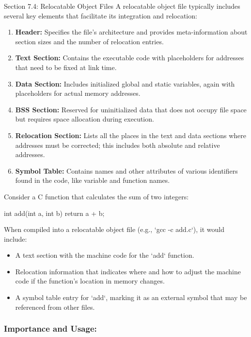 \begin{notes}{Section 7.4: Relocatable Object Files}
    A relocatable object file typically includes several key elements that facilitate its integration and relocation:
    \begin{enumerate}
        \item \textbf{Header:} Specifies the file's architecture and provides meta-information about section sizes and the number of relocation entries.
        \item \textbf{Text Section:} Contains the executable code with placeholders for addresses that need to be fixed at link time.
        \item \textbf{Data Section:} Includes initialized global and static variables, again with placeholders for actual memory addresses.
        \item \textbf{BSS Section:} Reserved for uninitialized data that does not occupy file space but requires space allocation during execution.
        \item \textbf{Relocation Section:} Lists all the places in the text and data sections where addresses must be corrected; this includes both absolute and relative addresses.
        \item \textbf{Symbol Table:} Contains names and other attributes of various identifiers found in the code, like variable and function names.
    \end{enumerate}

    \begin{highlight}[Example]
        Consider a C function that calculates the sum of two integers:
    \begin{code}[C]
    int add(int a, int b) {
        return a + b;
    }
    \end{code}
        When compiled into a relocatable object file (e.g., `gcc -c add.c`), it would include:
        \begin{itemize}
            \item A text section with the machine code for the `add` function.
            \item Relocation information that indicates where and how to adjust the machine code if the function's location in memory changes.
            \item A symbol table entry for `add`, marking it as an external symbol that may be referenced from other files.
        \end{itemize}
    \end{highlight}

    \subsubsection*{Importance and Usage:}
    

\end{notes}
